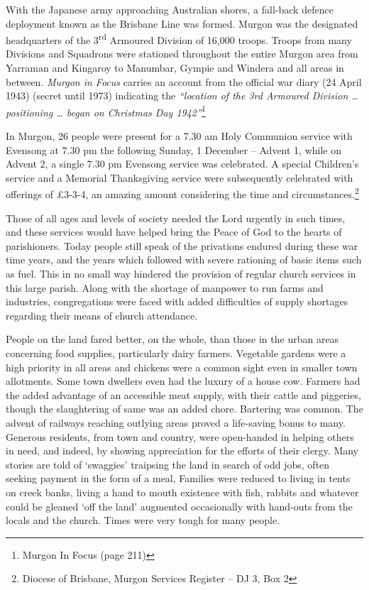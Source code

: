 With the Japanese army approaching Australian shores, a fall-back defence deployment known as the Brisbane Line was formed. Murgon was the designated headquarters of the 3\textsuperscript{rd} Armoured Division of 16,000 troops. Troops from many Divisions and Squadrons were stationed throughout the entire Murgon area from Yarraman and Kingaroy to Manumbar, Gympie and Windera and all areas in between. \emph{Murgon in Focus} carries an account from the official war diary (24 April 1943) (secret until 1973) indicating the \emph{``location of the 3rd Armoured Division \ldots{} positioning \ldots{} began on Christmas Day 1942''}\footnote{Murgon In Focus (page 211)}


In Murgon, 26 people were present for a 7.30 am Holy Communion service with Evensong at 7.30 pm the following Sunday, 1 December -- Advent 1, while on Advent 2, a single 7.30 pm Evensong service was celebrated. A special Children's service and a Memorial Thanksgiving service were subsequently celebrated with offerings of \pounds3-3-4, an amazing amount considering the time and circumstances.\footnote{Diocese of Brisbane, Murgon Services Register -- DJ 3, Box 2}


Those of all ages and levels of society needed the Lord urgently in such times, and these services would have helped bring the Peace of God to the hearts of parishioners. Today people still speak of the privations endured during these war time years, and the years which followed with severe rationing of basic items such as fuel. This in no small way hindered the provision of regular church services in this large parish. Along with the shortage of manpower to run farms and industries, congregations were faced with added difficulties of supply shortages regarding their means of church attendance.



People on the land fared better, on the whole, than those in the urban areas concerning food supplies, particularly dairy farmers. Vegetable gardens were a high priority in all areas and chickens were a common sight even in smaller town allotments. Some town dwellers even had the luxury of a house cow. Farmers had the added advantage of an accessible meat supply, with their cattle and piggeries, though the slaughtering of same was an added chore. Bartering was common. The advent of railways reaching outlying areas proved a life-saving bonus to many. Generous residents, from town and country, were open-handed in helping others in need, and indeed, by showing appreciation for the efforts of their clergy. Many stories are told of `swaggies' traipsing the land in search of odd jobs, often seeking payment in the form of a meal, Families were reduced to living in tents on creek banks, living a hand to mouth existence with fish, rabbits and whatever could be gleaned `off the land' augmented occasionally with hand-outs from the locals and the church. Times were very tough for many people.



